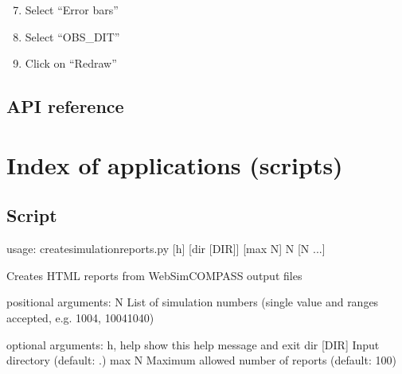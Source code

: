 \documentclass[letterpaper,10pt,english]{sphinxmanual}
\begin{document}
\begin{enumerate}
\setcounter{enumi}{6}
\item {} 
Select “Error bars”

\item {} 
Select “OBS\_DIT”

\item {} 
Click on “Redraw”

\end{enumerate}



\section{API reference}
\label{\detokenize{aosss:api-reference}}


\chapter{Index of applications (scripts)}
\label{\detokenize{scripts::doc}}\label{\detokenize{scripts:index-of-applications-scripts}}

\section{Script }
\label{\detokenize{autoscripts/script-create-simulation-reports::doc}}\label{\detokenize{autoscripts/script-create-simulation-reports:script-create-simulation-reports-py}}
\begin{sphinxVerbatim}[commandchars=\\\{\}]
usage: create\PYGZhy{}simulation\PYGZhy{}reports.py [\PYGZhy{}h] [\PYGZhy{}\PYGZhy{}dir [DIR]] [\PYGZhy{}\PYGZhy{}max N] N [N ...]

Creates HTML reports from WebSim\PYGZhy{}COMPASS output files

positional arguments:
  N            List of simulation numbers (single value and ranges accepted,
               e.g. 1004, 1004\PYGZhy{}1040)

optional arguments:
  \PYGZhy{}h, \PYGZhy{}\PYGZhy{}help   show this help message and exit
  \PYGZhy{}\PYGZhy{}dir [DIR]  Input directory (default: .)
  \PYGZhy{}\PYGZhy{}max N      Maximum allowed number of reports (default: 100)
\end{sphinxVerbatim}
\end{document}
